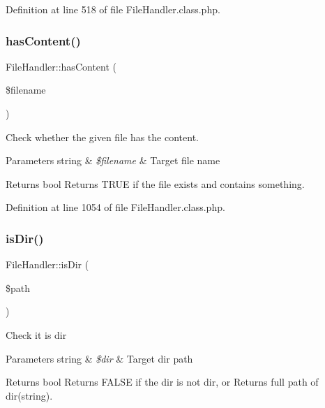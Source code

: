 Definition at line 518 of file File\+Handler.\+class.\+php.

\mbox{\label{classFileHandler_ad872016e83b1f62a03d54e359ce31f73}} 
\subsubsection{\texorpdfstring{has\+Content()}{hasContent()}}
{\footnotesize\ttfamily File\+Handler\+::has\+Content (\begin{DoxyParamCaption}\item[{}]{\$filename }\end{DoxyParamCaption})}

Check whether the given file has the content.


\begin{DoxyParams}[1]{Parameters}
string & {\em \$filename} & Target file name \\
\hline
\end{DoxyParams}
\begin{DoxyReturn}{Returns}
bool Returns T\+R\+UE if the file exists and contains something. 
\end{DoxyReturn}


Definition at line 1054 of file File\+Handler.\+class.\+php.

\mbox{\label{classFileHandler_a5fd371542d6f1a86269d0b8795e74471}} 
\subsubsection{\texorpdfstring{is\+Dir()}{isDir()}}
{\footnotesize\ttfamily File\+Handler\+::is\+Dir (\begin{DoxyParamCaption}\item[{}]{\$path }\end{DoxyParamCaption})}

Check it is dir


\begin{DoxyParams}[1]{Parameters}
string & {\em \$dir} & Target dir path \\
\hline
\end{DoxyParams}
\begin{DoxyReturn}{Returns}
bool Returns F\+A\+L\+SE if the dir is not dir, or Returns full path of dir(string). 
\end{DoxyReturn}


